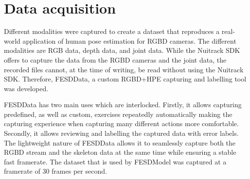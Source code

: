 \section{Data acquisition}
\label{sec:data_acquisition}

Different modalities were captured to create a dataset that reproduces a real-world application of human pose estimation for RGBD cameras. The different modalities are RGB data, depth data, and joint data. While the Nuitrack SDK offers to capture the data from the RGBD cameras and the joint data, the recorded files cannot, at the time of writing, be read without using the Nuitrack SDK. Therefore, FESDData, a custom RGBD+HPE capturing and labelling tool was developed. 

FESDData has two main uses which are interlocked. Firstly, it allows capturing predefined, as well as custom, exercises repeatedly automatically making the capturing experience when capturing many different actions more comfortable. Secondly, it allows reviewing and labelling the captured data with error labels. The lightweight nature of FESDData allows it to seamlessly capture both the RGBD stream and the skeleton data at the same time while ensuring a stable fast framerate. The dataset that is used by FESDModel was captured at a framerate of 30 frames per second.
